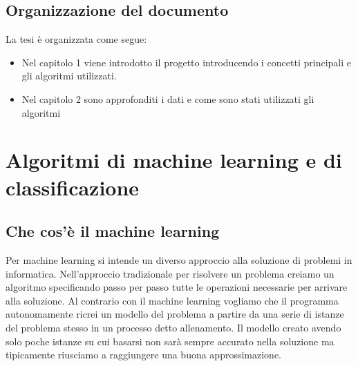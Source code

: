 \documentclass[a4paper,12pt]{report}
\begin{document}
%
%
\section{Organizzazione del documento}
\label{organizzazione}
La tesi \`e organizzata come segue:
\begin{itemize}
	\item Nel capitolo 1 viene introdotto il progetto introducendo i concetti
	principali e gli algoritmi utilizzati.

	\item Nel capitolo 2 sono approfonditi i dati e come sono stati utilizzati
	gli algoritmi

\end{itemize}
%
%
% 
% 
\chapter[Algoritmi di ML e classificazione]{Algoritmi di machine learning e di classificazione}
\label{cap1}

\section{Che cos'è il machine learning}

Per machine learning si intende un diverso approccio alla soluzione di problemi in
informatica. Nell'approccio tradizionale per risolvere un problema creiamo un
algoritmo specificando passo per passo tutte le operazioni necessarie per
arrivare alla soluzione. Al contrario con il machine learning vogliamo che il
programma autonomamente ricrei un modello del problema a partire da una serie di
istanze del problema stesso in un processo detto allenamento. Il modello creato
avendo solo poche istanze su cui basarsi non sarà sempre accurato nella
soluzione ma tipicamente riusciamo a raggiungere una buona approssimazione. 

\end{document}
